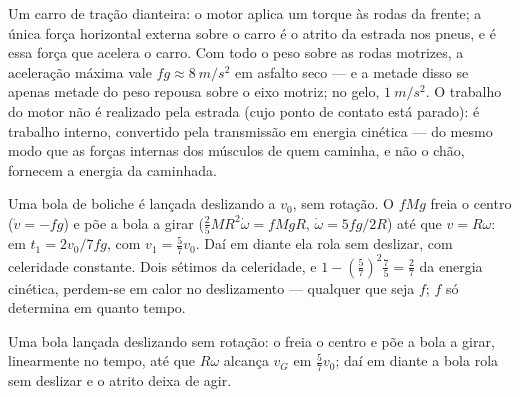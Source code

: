 \begin{example}\label{ex:b2:rigid-body-mechanics:car}
Um carro de tração dianteira: o motor aplica um torque às rodas da
frente; a única força horizontal externa sobre o carro é o atrito da
estrada nos pneus, e é essa força que acelera o carro. Com todo o peso
sobre as rodas motrizes, a aceleração máxima vale
$fg \approx \qty{8}{m/s^2}$ em asfalto seco --- e a metade disso se apenas
metade do peso repousa sobre o eixo motriz; no gelo, $\qty{1}{m/s^2}$. O
trabalho do motor não é realizado pela estrada (cujo ponto de contato
está parado): é trabalho interno, convertido pela transmissão em
energia cinética --- do mesmo modo que as forças internas dos músculos
de quem caminha, e não o chão, fornecem a energia da caminhada.
\end{example}

\begin{example}\label{ex:b2:rigid-body-mechanics:bowling}
Uma bola de boliche é lançada deslizando a $v_0$, sem rotação. O  $fMg$ freia o centro ($\dot v = -fg$) e põe a bola a girar
($\tfrac25MR^2\dot\omega = fMgR$, $\dot\omega = 5fg/2R$) até que $v = R\omega$:
em $t_1 = 2v_0/7fg$, com $v_1 = \tfrac57v_0$. Daí em diante ela rola
sem deslizar, com celeridade constante. Dois sétimos da celeridade, e
$1 - (\tfrac57)^2\tfrac75 = \tfrac27$ da energia cinética, perdem-se em calor
no deslizamento --- qualquer que seja $f$; $f$ só determina em quanto tempo.
\end{example}

\begin{omfigure}

{\small Uma bola lançada deslizando sem rotação: o  freia
o centro e põe a bola a girar, linearmente no tempo, até que $R\omega$
alcança $v_G$ em $\tfrac57v_0$; daí em diante a bola rola sem
deslizar e o atrito deixa de agir.}
\end{omfigure}

